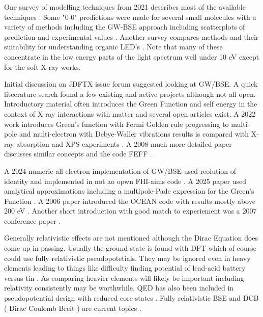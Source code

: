 
One survey of modelling techniques from 2021 describes most
of the available techniques  \cite{Tirimbo_Baumeier_initio_modeling_2021}.
Some "0-0" predictions were made for several small molecules with
a variety of methods including the GW-BSE approach including 
scatterplots of prediction and experimental values 
\cite{Jacquemin_Duchemin_Blase_Energies_Using_2015}.
Another survey compares methods and their suitability for 
understanding organic LED's \cite{Chaudhuri_Patterson_TDDFT_versus_2022}.
Note that many of these concentrate in the low energy parts
of the light spectrum well under 10 eV except for the soft
X-ray works. 


Initial discussion on JDFTX issue forum suggested looking at 
GW/BSE. A quick liteerature search found a few existing and active
projects although not all open. Introductory material
often introduces the Green Function and self energy in the context
of X-ray interactions with matter and several open articles
exist. A 2022 work introduces Green's function with Fermi Golden rule
 progressing to multi-pole and multi-electron with Debye-Waller
vibrations 
results  is compared with X-ray absorption and XPS experiments
\cite{Kas_Rehr_Vila_Green_functions_applied_2022}. 
A 2008 much more detailed paper discusses similar concepts
and the code FEFF 
\cite{Rehr_Kas_Prange_initio_theory_2009}.

A 2024 numeric all electron implementation of GW/BSE used reolution of identity
and implemented in not ao opwn FHI-aims code 
\cite{Zhou_Yao_Blum_electron_2024}.
A 2025 paper used analytical approximations including a multipole-Pade 
expression for the Green's Function
\cite{2025arXiv250109121L}.
A 2006 paper introduced the OCEAN code with results mostly above 200 eV
\cite{Gilmore_Vinson_Shirley_Efficient_implementation_core_2015}.
Another short introduction with good match to experiement was
a 2007 conference paper 
\cite{Rehr_Kas_Prange_Inelastic_Losses_Multi_2007}.

Generally relativistic effects are not mentioned although the Dirac
Equation does come up in passing. Usually the ground state is found
with DFT which of course could use fully relativistic pseudopotetials.
They may be ignored even in heavy elements leading to things like 
difficulty finding potential of lead-acid battery versus tin
\cite{Ahuja_Blomqvist_Larsson_Relativity_Lead_2011}
. As comparing heavier elements will likely be important including
relativity consistently may be worthwhile.
QED has also been included in pseudopotential design with reduced
core states
\cite{Zaitsevskii_Mosyagin_Oleynichenko_Generalized_relativistic_smallcore_pseudopotentials_2023}.
Fully relativistic BSE and DCB ( Dirac Coulomb Breit ) are current
topics \cite{Ferenc_Matyus_Born_Oppenheimer_Dirac_2023}.



